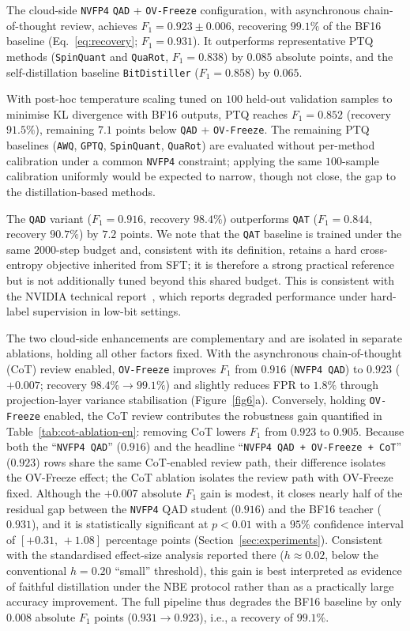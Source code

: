 \documentclass[a4paper,fleqn]{cas-sc}
\begin{document}
The cloud-side \texttt{NVFP4} \texttt{QAD} + \texttt{OV-Freeze} configuration, with asynchronous chain-of-thought review, achieves $F_1 = 0.923 \pm 0.006$, recovering $99.1\%$ of the BF16 baseline (Eq.~\eqref{eq:recovery}; $F_1 = 0.931$). It outperforms representative PTQ methods (\texttt{SpinQuant} and \texttt{QuaRot}, $F_1 = 0.838$) by $0.085$ absolute points, and the self-distillation baseline \texttt{BitDistiller} ($F_1 = 0.858$) by $0.065$.

With post-hoc temperature scaling tuned on $100$ held-out validation samples to minimise KL divergence with BF16 outputs, PTQ reaches $F_1 = 0.852$ (recovery $91.5\%$), remaining $7.1$ points below \texttt{QAD} + \texttt{OV-Freeze}. The remaining PTQ baselines (\texttt{AWQ}, \texttt{GPTQ}, \texttt{SpinQuant}, \texttt{QuaRot}) are evaluated without per-method calibration under a common \texttt{NVFP4} constraint; applying the same $100$-sample calibration uniformly would be expected to narrow, though not close, the gap to the distillation-based methods.

The \texttt{QAD} variant ($F_1 = 0.916$, recovery $98.4\%$) outperforms \texttt{QAT} ($F_1 = 0.844$, recovery $90.7\%$) by $7.2$ points. We note that the \texttt{QAT} baseline is trained under the same $2000$-step budget and, consistent with its definition, retains a hard cross-entropy objective inherited from SFT; it is therefore a strong practical reference but is not additionally tuned beyond this shared budget. This is consistent with the NVIDIA technical report~\citep{3}, which reports degraded performance under hard-label supervision in low-bit settings.

The two cloud-side enhancements are complementary and are isolated in separate ablations, holding all other factors fixed. With the asynchronous chain-of-thought (CoT) review enabled, \texttt{OV-Freeze} improves $F_1$ from $0.916$ (\texttt{NVFP4 QAD}) to $0.923$ ($+0.007$; recovery $98.4\%\rightarrow99.1\%$) and slightly reduces FPR to $1.8\%$ through projection-layer variance stabilisation (Figure~\ref{fig6}a). Conversely, holding \texttt{OV-Freeze} enabled, the CoT review contributes the robustness gain quantified in Table~\ref{tab:cot-ablation-en}: removing CoT lowers $F_1$ from $0.923$ to $0.905$. Because both the ``\texttt{NVFP4 QAD}'' ($0.916$) and the headline ``\texttt{NVFP4 QAD + OV-Freeze + CoT}'' ($0.923$) rows share the same CoT-enabled review path, their difference isolates the OV-Freeze effect; the CoT ablation isolates the review path with OV-Freeze fixed. Although the $+0.007$ absolute $F_1$ gain is modest, it closes nearly half of the residual gap between the \texttt{NVFP4} QAD student ($0.916$) and the BF16 teacher ($0.931$), and it is statistically significant at $p<0.01$ with a $95\%$ confidence interval of $[+0.31,\,+1.08]$ percentage points (Section~\ref{sec:experiments}). Consistent with the standardised effect-size analysis reported there ($h \approx 0.02$, below the conventional $h = 0.20$ ``small'' threshold), this gain is best interpreted as evidence of faithful distillation under the NBE protocol rather than as a practically large accuracy improvement.
The full pipeline thus degrades the BF16 baseline by only $0.008$ absolute $F_1$ points ($0.931 \rightarrow 0.923$), i.e., a recovery of $99.1\%$.
\end{document}
